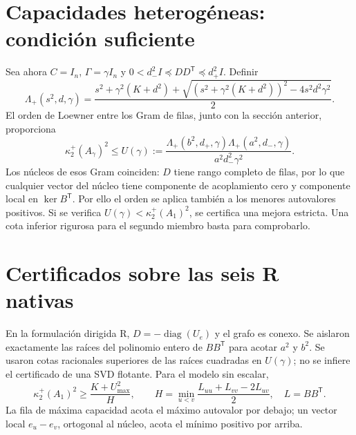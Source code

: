 \documentclass[10pt,a4paper]{article}
\begin{document}
\section{Capacidades heterogéneas: condición suficiente}
Sea ahora $C=I_n$, $\Gamma=\gamma I_n$ y
$0<d_-^2I\preceq DD^{\mathsf T}\preceq d_+^2I$.
Definir
\[
 \Lambda_+(s^2,d,\gamma)=\frac{s^2+\gamma^2(K+d^2)+
 \sqrt{(s^2+\gamma^2(K+d^2))^2-4s^2d^2\gamma^2}}2.
\]
El orden de Loewner entre los Gram de filas, junto con la sección anterior,
proporciona
\[
 \kappa_2^+(A_\gamma)^2\le
 U(\gamma):=\frac{\Lambda_+(b^2,d_+,\gamma)
 \Lambda_+(a^2,d_-,\gamma)}{a^2d_-^2\gamma^2}.
\]
Los núcleos de esos Gram coinciden: $D$ tiene rango completo de filas, por lo
que cualquier vector del núcleo tiene componente de acoplamiento cero y
componente local en $\ker B^{\mathsf T}$. Por ello el orden se aplica también
a los menores autovalores positivos. Si se verifica
$U(\gamma)<\kappa_2^+(A_1)^2$, se certifica una mejora estricta.
Una cota inferior rigurosa para el segundo miembro basta para comprobarlo.

\section{Certificados sobre las seis R nativas}
En la formulación dirigida R, $D=-\operatorname{diag}(U_e)$ y el grafo es
conexo. Se aislaron exactamente las raíces del polinomio entero de $BB^{\mathsf T}$
para acotar $a^2$ y $b^2$. Se usaron cotas racionales superiores de las raíces
cuadradas en $U(\gamma)$; no se infiere el certificado de una SVD flotante.
Para el modelo sin escalar,
\[
 \kappa_2^+(A_1)^2\ge\frac{K+U_{\max}^2}{H},\qquad
 H=\min_{u<v}\frac{L_{uu}+L_{vv}-2L_{uv}}2,\quad L=BB^{\mathsf T}.
\]
La fila de máxima capacidad acota el máximo autovalor por debajo; un vector
local $e_u-e_v$, ortogonal al núcleo, acota el mínimo positivo por arriba.
\end{document}
